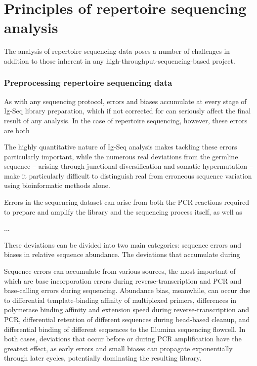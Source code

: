 \chapter{Principles of repertoire sequencing analysis}


The analysis of repertoire sequencing data poses a number of challenges in addition to those inherent in any high-throughput-sequencing-based project. 

\subsection{Preprocessing repertoire sequencing data}

As with any sequencing protocol, errors and biases accumulate at every stage of Ig-Seq library preparation, which if not corrected for can seriously affect the final result of any analysis. In the case of repertoire sequencing, however, these errors are both

The highly quantitative nature of Ig-Seq analysis makes tackling these errors particularly important, while the numerous real deviations from the germline sequence -- arising through junctional diversification and somatic hypermutation -- make it particularly difficult to distinguish real from erroneous sequence variation using bioinformatic methods alone. 

Errors in the sequencing dataset can arise from both the PCR reactions required to prepare and amplify the library and the sequencing process itself, as well as 


...

These deviations can be divided into two main categories: sequence errors and biases in relative sequence abundance.
The deviations that accumulate during 

Sequence errors can accumulate from various sources, the most important of which are base incorporation errors during reverse-transcription and PCR and base-calling errors during sequencing. Abundance bias, meanwhile, can occur due to differential template-binding affinity of multiplexed primers, differences in polymerase binding affinity and extension speed during reverse-transcription and PCR, differential retention of different sequences during bead-based cleanup, and differential binding of different sequences to the Illumina sequencing flowcell. %
In both cases, deviations that occur before or during PCR amplification have the greatest effect, as early errors and small biases can propagate exponentially through later cycles, potentially dominating the resulting library.
 

